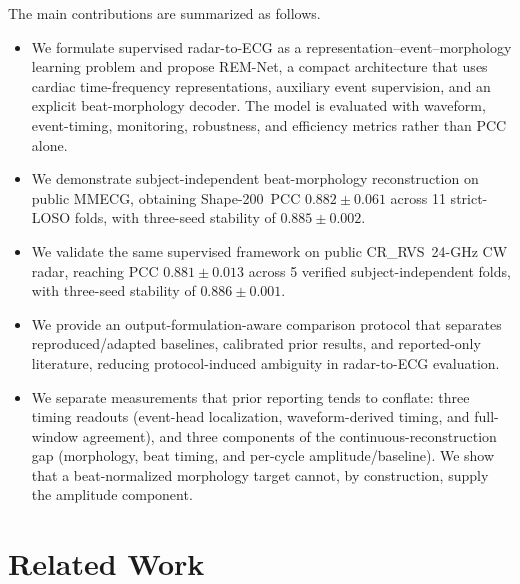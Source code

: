 \documentclass[lettersize,journal]{IEEEtran}
\newcommand{\remnet}{REM-Net\xspace}
\newcommand{\shape}{Shape-200\xspace}
\newcommand{\crrvs}{CR\_RVS\xspace}
\begin{document}
The main contributions are summarized as follows.
\begin{itemize}
    \item We formulate supervised radar-to-ECG as a representation--event--morphology learning problem and propose \remnet, a compact architecture that uses cardiac time-frequency representations, auxiliary event supervision, and an explicit beat-morphology decoder. The model is evaluated with waveform, event-timing, monitoring, robustness, and efficiency metrics rather than PCC alone.
    \item We demonstrate subject-independent beat-morphology reconstruction on public MMECG, obtaining \shape\ PCC $0.882 \pm 0.061$ across 11 strict-LOSO folds, with three-seed stability of $0.885 \pm 0.002$.
    \item We validate the same supervised framework on public \crrvs\ 24-GHz CW radar, reaching PCC $0.881 \pm 0.013$ across 5 verified subject-independent folds, with three-seed stability of $0.886 \pm 0.001$.
    \item We provide an output-formulation-aware comparison protocol that separates reproduced/adapted baselines, calibrated prior results, and reported-only literature, reducing protocol-induced ambiguity in radar-to-ECG evaluation.
    \item We separate measurements that prior reporting tends to conflate: three timing readouts (event-head localization, waveform-derived timing, and full-window agreement), and three components of the continuous-reconstruction gap (morphology, beat timing, and per-cycle amplitude/baseline). We show that a beat-normalized morphology target cannot, by construction, supply the amplitude component.
\end{itemize}

\section{Related Work}
\end{document}

